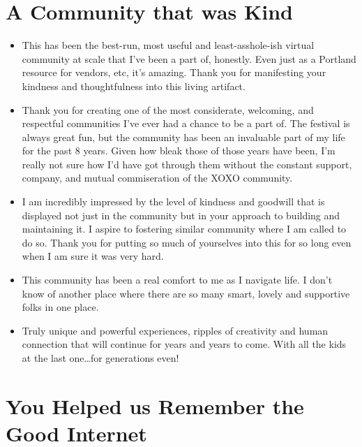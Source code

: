 \documentclass[
]{book}
\providecommand{\tightlist}{%
  \setlength{\itemsep}{0pt}\setlength{\parskip}{0pt}}
\begin{document}
\section{A Community that was Kind}\label{a-community-that-was-kind}

\begin{itemize}
\tightlist
\item
  This has been the best-run, most useful and least-asshole-ish virtual community at scale that I've been a part of, honestly. Even just as a Portland resource for vendors, etc, it's amazing. Thank you for manifesting your kindness and thoughtfulness into this living artifact.
\item
  Thank you for creating one of the most considerate, welcoming, and respectful communities I've ever had a chance to be a part of. The festival is always great fun, but the community has been an invaluable part of my life for the past 8 years. Given how bleak those of those years have been, I'm really not sure how I'd have got through them without the constant support, company, and mutual commiseration of the XOXO community.
\item
  I am incredibly impressed by the level of kindness and goodwill that is displayed not just in the community but in your approach to building and maintaining it. I aspire to fostering similar community where I am called to do so. Thank you for putting so much of yourselves into this for so long even when I am sure it was very hard.
\item
  This community has been a real comfort to me as I navigate life. I don't know of another place where there are so many smart, lovely and supportive folks in one place.
\item
  Truly unique and powerful experiences, ripples of creativity and human connection that will continue for years and years to come. With all the kids at the last one\ldots for generations even!
\end{itemize}

\section{You Helped us Remember the Good Internet}\label{you-helped-us-remember-the-good-internet}
\end{document}
